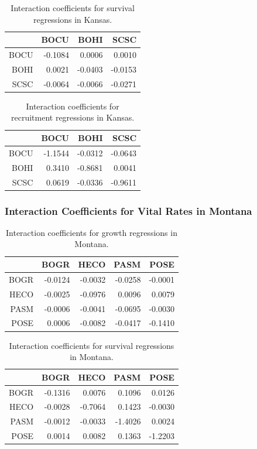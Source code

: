 \documentclass[12pt,]{article}
\begin{document}
\begin{table}[ht]
\centering
\caption{Interaction coefficients for survival regressions in Kansas.} 
\begin{tabular}{rrrr}
  \hline
 & BOCU & BOHI & SCSC \\ 
  \hline
BOCU & -0.1084 & 0.0006 & 0.0010 \\ 
  BOHI & 0.0021 & -0.0403 & -0.0153 \\ 
  SCSC & -0.0064 & -0.0066 & -0.0271 \\ 
   \hline
\end{tabular}
\end{table}

\begin{table}[ht]
\centering
\caption{Interaction coefficients for recruitment regressions in Kansas.} 
\begin{tabular}{rrrr}
  \hline
 & BOCU & BOHI & SCSC \\ 
  \hline
BOCU & -1.1544 & -0.0312 & -0.0643 \\ 
  BOHI & 0.3410 & -0.8681 & 0.0041 \\ 
  SCSC & 0.0619 & -0.0336 & -0.9611 \\ 
   \hline
\end{tabular}
\end{table}



\newpage{}

\subsubsection{Interaction Coefficients for Vital Rates in Montana}

\begin{table}[ht]
\centering
\caption{Interaction coefficients for growth regressions in Montana.} 
\begin{tabular}{rrrrr}
  \hline
 & BOGR & HECO & PASM & POSE \\ 
  \hline
BOGR & -0.0124 & -0.0032 & -0.0258 & -0.0001 \\ 
  HECO & -0.0025 & -0.0976 & 0.0096 & 0.0079 \\ 
  PASM & -0.0006 & -0.0041 & -0.0695 & -0.0030 \\ 
  POSE & 0.0006 & -0.0082 & -0.0417 & -0.1410 \\ 
   \hline
\end{tabular}
\end{table}

\begin{table}[ht]
\centering
\caption{Interaction coefficients for survival regressions in Montana.} 
\begin{tabular}{rrrrr}
  \hline
 & BOGR & HECO & PASM & POSE \\ 
  \hline
BOGR & -0.1316 & 0.0076 & 0.1096 & 0.0126 \\ 
  HECO & -0.0028 & -0.7064 & 0.1423 & -0.0030 \\ 
  PASM & -0.0012 & -0.0033 & -1.4026 & 0.0024 \\ 
  POSE & 0.0014 & 0.0082 & 0.1363 & -1.2203 \\ 
   \hline
\end{tabular}
\end{table}
\end{document}
